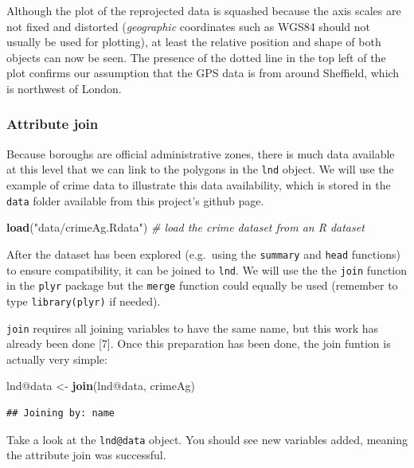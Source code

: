 \documentclass[]{article}
\newenvironment{Shaded}{}{}
\newcommand{\KeywordTok}[1]{\textcolor[rgb]{0.00,0.44,0.13}{\textbf{{#1}}}}
\newcommand{\StringTok}[1]{\textcolor[rgb]{0.25,0.44,0.63}{{#1}}}
\newcommand{\CommentTok}[1]{\textcolor[rgb]{0.38,0.63,0.69}{\textit{{#1}}}}
\newcommand{\NormalTok}[1]{{#1}}
\begin{document}
Although the plot of the reprojected data is squashed because the axis
scales are not fixed and distorted (\emph{geographic} coordinates such
as WGS84 should not usually be used for plotting), at least the relative
position and shape of both objects can now be seen. The presence of the
dotted line in the top left of the plot confirms our assumption that the
GPS data is from around Sheffield, which is northwest of London.

\subsubsection{Attribute join}

Because boroughs are official administrative zones, there is much data
available at this level that we can link to the polygons in the
\texttt{lnd} object. We will use the example of crime data to illustrate
this data availability, which is stored in the \texttt{data} folder
available from this project's github page.

\begin{Shaded}
\begin{Highlighting}[]
\KeywordTok{load}\NormalTok{(}\StringTok{"data/crimeAg.Rdata"}\NormalTok{)  }\CommentTok{# load the crime dataset from an R dataset}
\end{Highlighting}
\end{Shaded}
After the dataset has been explored (e.g.~using the \texttt{summary} and
\texttt{head} functions) to ensure compatibility, it can be joined to
\texttt{lnd}. We will use the the \texttt{join} function in the
\texttt{plyr} package but the \texttt{merge} function could equally be
used (remember to type \texttt{library(plyr)} if needed).

\texttt{join} requires all joining variables to have the same name, but
this work has already been done {[}7{]}. Once this preparation has been
done, the join funtion is actually very simple:

\begin{Shaded}
\begin{Highlighting}[]
\NormalTok{lnd@data <- }\KeywordTok{join}\NormalTok{(lnd@data, crimeAg)}
\end{Highlighting}
\end{Shaded}
\begin{verbatim}
## Joining by: name
\end{verbatim}
Take a look at the \texttt{lnd@data} object. You should see new
variables added, meaning the attribute join was successful.
\end{document}
